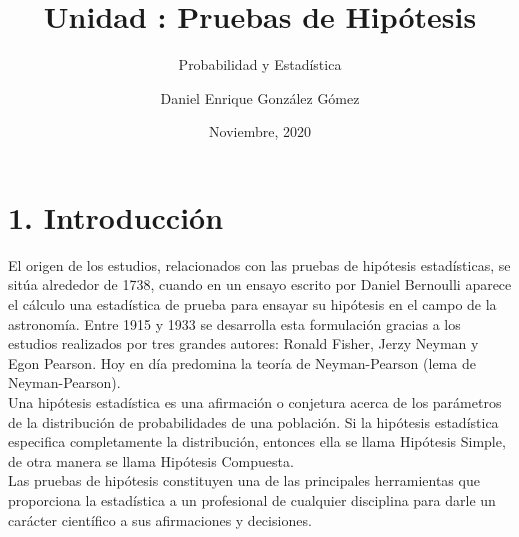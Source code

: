 \documentclass[base=hide,11pt]{elegantbook}
\title{Unidad : Pruebas de Hipótesis}
\subtitle{Probabilidad y Estadística}
\author{Daniel Enrique González Gómez}
\institute{Pontificia Universidad Javeriana Cali}
\date{Noviembre, 2020}
\begin{document}

\maketitle

\frontmatter
%
\mainmatter
%
\section*{1. Introducción}

El origen de los estudios, relacionados con las pruebas de hipótesis estadísticas, se sitúa alrededor de 1738, cuando en un ensayo escrito por Daniel Bernoulli aparece el cálculo una estadística de prueba para ensayar su hipótesis en el campo de la astronomía. Entre 1915 y 1933 se desarrolla esta formulación gracias a los estudios realizados por tres grandes autores: Ronald Fisher, Jerzy Neyman y Egon Pearson. Hoy en día predomina la teoría de Neyman-Pearson (lema de Neyman-Pearson). \\

Una hipótesis estadística es una afirmación o conjetura acerca de los parámetros de la distribución de probabilidades de una población. Si la hipótesis estadística especifica completamente la distribución, entonces ella se llama Hipótesis Simple, de otra manera se llama Hipótesis Compuesta.\\ 

Las pruebas de hipótesis constituyen una de las principales herramientas que  proporciona la estadística a un profesional de cualquier disciplina para darle un carácter científico a sus afirmaciones y decisiones.\\
\end{document}
